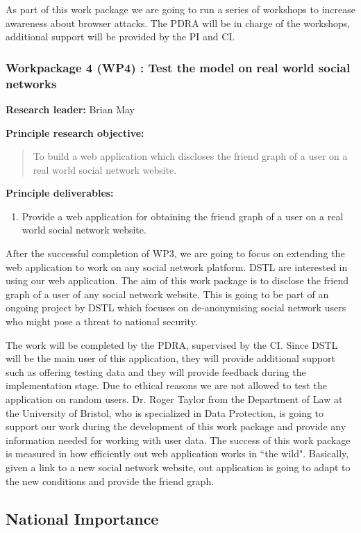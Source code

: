 \documentclass[a4paper,11pt]{article}
\begin{document}
As part of this work package we are going to run a series of workshops to increase  awareness about browser attacks. The PDRA will be in charge of the workshops, additional support will be provided by the PI and CI.

\subsubsection*{Workpackage 4 (WP4) : Test the model on real world social networks}
\textbf{Research leader:} Brian May

\textbf{Principle research objective:}
\begin{quote}
	To build a web application which discloses the friend graph of a user on a real world social network website.
\end{quote}

\textbf{Principle deliverables:}
\begin{enumerate}
\item Provide a web application for obtaining the friend graph of a user on a real world social network website.
\end{enumerate}

After the successful completion of WP3, we are going to focus on extending the web application to work on any social network platform. DSTL are interested in using our web application. The aim of this work package is to disclose the friend graph of a user of any social network website. This is going to be part of an ongoing project by DSTL which focuses on de-anonymising social network users who might pose a threat to national security.

The work will be completed by the PDRA, supervised by the CI. Since DSTL will be the main user of this application, they will provide additional support such as offering testing data and they will provide feedback during the implementation stage. Due to ethical reasons we are not allowed to test the application on random users. Dr. Roger Taylor from the Department of Law at the University of Bristol, who is specialized in Data Protection, is going to support our work during the development of this work package and provide any information needed for working with user data. The success of this work package is measured in how efficiently out web application works in ``the wild". Basically, given a link to a new social network website, out application is going to adapt to the new conditions and provide the friend graph. 

\subsection*{National Importance}
\end{document}

